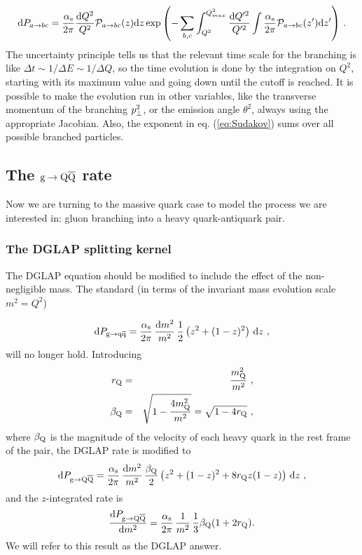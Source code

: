 \documentclass[a4paper,12pt]{article}
\begin{document}
\begin{equation}
  {\mathrm d} P_{a\to bc} = \frac{\alpha_{\mathrm{s}}}{2\pi}\frac{{\mathrm d} Q^2}{Q^2}\mathcal{P}_{a\to bc}(z) {\mathrm d} z \exp \left( -\sum_{b,c}\int^{Q^2_{max}}_{Q^2}\frac{{\mathrm d} Q'^2}{Q'^2} \int \frac{\alpha_{\mathrm{s}}}{2\pi} \mathcal{P}_{a\to bc}(z') {\mathrm d} z' \right)
  \label{eq:Sudakov}
  \, .
\end{equation}
The uncertainty principle tells us that the relevant time scale for the branching is like $\Delta t \sim 1/\Delta E \sim 1/\Delta Q$, so the time evolution is done by the integration on $Q^2$, starting with its maximum value and going down until the cutoff is reached. It is possible to make the evolution run in other variables, like the transverse momentum  of the branching $p_{\perp}^2$, or the emission angle $\theta^2$, always using the appropriate Jacobian. Also, the exponent in eq. (\ref{eq:Sudakov}) sums over all possible branched particles.

\subsection{The ${\mathrm g} \to {\mathrm Q}\overline{\mathrm Q}$ rate}

Now we are turning to the massive quark case to model the process we are interested in: gluon branching into a heavy quark-antiquark pair.

\subsubsection{The DGLAP splitting kernel}

The DGLAP equation should be modified to include the effect of the non-negligible mass. The standard (in terms of the invariant mass evolution scale $m^2=Q^2$)

\begin{equation}
{\mathrm d} P_{{\mathrm g} \to {\mathrm q}\overline{\mathrm q}} = \frac{\alpha_{\mathrm{s}}}{2\pi} \, \frac{{\mathrm d} m^2}{m^2} \,
\frac{1}{2} \left( z^2 + (1 - z)^2 \right) \, {\mathrm d} z ~ ,
\label{eq:DGLAP:gqq}
\end{equation}
will no longer hold. Introducing
\begin{eqnarray}
 r_{{\mathrm Q}} & = & \frac{ m_{{\mathrm Q}}^2 }{ m^2 } ~, \\
\beta_{{\mathrm Q}} & = & \sqrt{ 1 - \frac{ 4 m_{{\mathrm Q}}^2 }{ m^2 } }
   = \sqrt{ 1 - 4 r_{{\mathrm Q}} } ~,
\end{eqnarray}
where $\beta_{\mathrm Q}$ is the magnitude of the velocity of each heavy quark in the rest frame of the pair, the DGLAP rate is modified to
\begin{equation}
{\mathrm d} P_{{\mathrm g} \to {\mathrm Q}\overline{\mathrm Q}} = \frac{\alpha_{\mathrm{s}}}{2\pi} \, \frac{{\mathrm d} m^2}{m^2} \,
\frac{\beta_{{\mathrm Q}}}{2} \left( z^2 + (1 - z)^2 + 8 r_{{\mathrm Q}} z (1 - z) \right) 
\, {\mathrm d} z ~ , 
\end{equation}
and the $z$-integrated rate is
\begin{equation}
\frac{{\mathrm d} P_{{\mathrm g} \to {\mathrm Q}\overline{\mathrm Q}}}{{\mathrm d} m^2} = \frac{\alpha_{\mathrm{s}}}{2\pi} \, \frac{1}{m^2} \,
\frac{1}{3} \beta_{{\mathrm Q}} (1 + 2 r_{{\mathrm Q}}).
\label{m2DGLAP} 
\end{equation}
We will refer to this result as the DGLAP answer.
\end{document}
